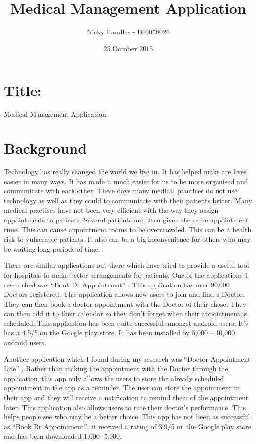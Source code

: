 \documentclass[12pt,ITBthesis]{report}
\begin{document}
	\setlength{\parskip}{1ex plus 0.5ex minus 0.2ex}
	
	\title{Medical Management Application}
	 
	\author{Nicky Randles - B00058026}
	
	\date{25 October 2015 }
	
	\maketitle
		
	\section{Title:}
	Medical Management Application
	
	\section{Background}
	Technology has really changed the world we live in. It has helped make are lives easier in many ways. It has made it much easier for us to be more organised and communicate with each other. These days many medical practices do not use technology as well as they could to communicate with their patients better. Many medical practises have not been very efficient with the way they assign appointments to patients. Several patients are often given the same appointment time. This can cause appointment rooms to be overcrowded. This can be a health risk to vulnerable patients. It also can be a big inconvenience for others who may be waiting long periods of time. 
	
	 There are similar applications out there which have tried to provide a useful tool for hospitals to make better arrangements for patients. One of the applications I researched was “Book Dr Appointment” \cite{1}. This application has over 90,000 Doctors registered. This application allows new users to join and find a Doctor. They can then book a doctor appointment with the Doctor of their chose. They can then add it to their calendar so they don’t forget when their appointment is scheduled. This application has been quite successful amongst android users. It’s has a 4.5/5 on the Google play store. It has been installed by 5,000 – 10,000 android users. 
	
	Another application which I found during my research was “Doctor Appointment Lite” \cite{2}. Rather than making the appointment with the Doctor through the application, this app only allows the users to store the already scheduled appointment in the app as a reminder. The user can store the appointment in their app and they will receive a notification to remind them of the appointment later. This application also allows users to rate their doctor’s performance. This helps people see who may be a better choice. This app has not been as successful as “Book Dr Appointment”, it received a rating of 3.9/5 on the Google play store and has been downloaded 1,000 -5,000.
	
\end{document}
